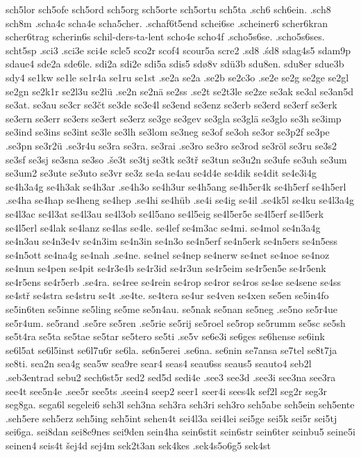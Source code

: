 {{sch5lor
sch5ofe
sch5ord
sch5org
sch5orte
sch5ortu
sch5ta
.sch6
sch6ein.
.sch8
sch8m
.scha4c
scha4e
scha5cher.
.schaf6t5end
schei6se
.scheiner6
scher6kran
scher6trag
scherin6s
schil-ders-ta-lent
scho4e
scho4f
.scho5s6se.
.scho5s6ses.
scht5sp
.sci3
.sci3e
sci4e
scle5
sco2r
scof4
scour5a
scre2
.sd8
.śd8
sdag4s5
sdam9p
sdaue4
sde2a
sde6le.
sdi2a
sdi2e
sdi5a
sdis5
sdø8v
sdü3b
sdu8en.
sdu8er
sdue3b
sdy4
se1kw
se1le
se1r4a
se1ru
se1st
.se2a
se2a
.se2b
se2c3o
.se2e
se2g
se2ge
se2gl
se2gn
se2k1r
se2l3u
se2lü
.se2n
se2nä
se2ss
.se2t
se2t3le
se2ze
se3ak
se3al
se3an5d
se3at.
se3au
se3cr
se3čt
se3de
se3e4l
se3end
se3enz
se3erb
se3erd
se3erf
se3erk
se3ern
se3err
se3ers
se3ert
se3erz
se3ge
se3gev
se3gla
se3glä
se3glo
se3h
se3imp
se3ind
se3ins
se3int
se3le
se3lh
se3lom
se3neg
se3of
se3oh
se3or
se3p2f
se3pe
.se3pn
se3r2ü
.se3r4u
se3ra
se3ra.
se3rai
.se3ro
se3ro
se3rod
se3röl
se3ru
se3s2
se3sf
se3sj
se3sna
se3so
.še3t
se3tj
se3tk
se3tř
se3tun
se3u2n
se3ufe
se3uh
se3um
se3um2
se3ute
se3uto
se3vr
se3z
se4a
se4au
se4d4e
se4dik
se4dit
se4e3i4g
se4h3a4g
se4h3ak
se4h3ar
.se4h3o
se4h3ur
se4h5ang
se4h5er4k
se4h5erf
se4h5erl
.se4ha
se4hap
se4heng
se4hep
.se4hi
se4hüb
.se4i
se4ig
se4il
.se4k5l
se4ku
se4l3a4g
se4l3ac
se4l3at
se4l3au
se4l3ob
se4l5ano
se4l5eig
se4l5er5e
se4l5erf
se4l5erk
se4l5erl
se4lak
se4lanz
se4las
se4le.
se4lef
se4m3ac
se4mi.
se4mol
se4n3a4g
se4n3au
se4n3e4v
se4n3im
se4n3in
se4n3o
se4n5erf
se4n5erk
se4n5ers
se4n5ess
se4n5ott
se4na4g
se4nah
.se4ne.
se4nel
se4nep
se4nerw
se4net
se4noe
se4noz
se4nun
se4pen
se4pit
se4r3e4b
se4r3id
se4r3un
se4r5eim
se4r5en5e
se4r5enk
se4r5ens
se4r5erb
.se4ra.
se4ree
se4rein
se4rop
se4ror
se4ros
se4se
se4sene
se4ss
se4stř
se4stra
se4stru
se4t
.se4te.
se4tera
se4ur
se4ven
se4xen
se5en
se5in4fo
se5in6ten
se5inne
se5ling
se5me
se5n4au.
se5nak
se5nan
se5neg
.se5no
se5r4ue
se5r4um.
se5rand
.se5re
se5ren
.se5rie
se5rij
se5roel
se5rop
se5rumm
se5sc
se5sh
se5t4ra
se5ta
se5tae
se5tar
se5tero
se5ti
.se5v
se6e3i
se6ges
se6hense
se6ink
se6l5at
se6l5inst
se6l7u6r
se6la.
se6n5erei
.se6na.
se6nin
se7ansa
se7tel
se8t7ja
se8ti.
sea2n
sea4g
sea5w
sea9re
sear4
seas4
seau6ss
seaus5
seauto4
seb2l
.seb3entrad
sebu2
sech6st5r
sed2
sed5d
sedi4e
.see3
see3d
.see3i
see3na
see3ra
see4t
see5n4e
.see5r
see5ts
.seein4
seep2
seer1
seer4i
sees4k
sef2l
seg2r
seg3r
seg8ga.
sega6l
segelei6
seh3l
seh3na
seh3ra
seh3ri
seh3ro
seh5abe
seh5ein
seh5ente
.seh5ere
seh5erz
seh5ing
seh5int
sehen4t
sei4l3a
sei4lei
sei5ge
sei5k
sei5r
sei5tj
sei6ga.
sei8dan
sei8e9nes
sei9den
sein4ha
sein6stit
sein6str
sein6ter
seinbu5
seine5i
seinen4
seis4t
šej4d
sej4m
sek2t3an
sek4kes
.sek4s5o6g5
sek4st
}}
